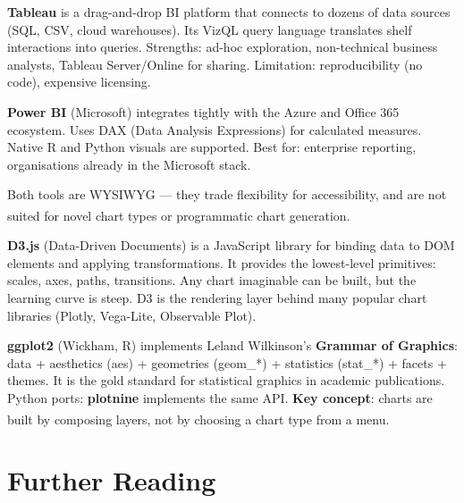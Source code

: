 \begin{tcbitemize}[ skin=sectionraster ]
    \tcbitem[title={Tableau and Power BI}, raster multicolumn=3]
    \textbf{Tableau} is a drag-and-drop BI platform that connects to dozens of data
    sources (SQL, CSV, cloud warehouses). Its VizQL query language translates shelf
    interactions into queries. Strengths: ad-hoc exploration, non-technical business
    analysts, Tableau Server/Online for sharing. Limitation: reproducibility (no code),
    expensive licensing.

    \textbf{Power BI} (Microsoft) integrates tightly with the Azure and Office 365
    ecosystem. Uses DAX (Data Analysis Expressions) for calculated measures. Native
    R and Python visuals are supported. Best for: enterprise reporting, organisations
    already in the Microsoft stack.

    Both tools are WYSIWYG --- they trade flexibility for accessibility, and are not
    suited for novel chart types or programmatic chart generation\textsuperscript{\cite[][pp.~1--30]{jansenHandbuchInfografik1999}}.

    \tcbitem[title={D3.js and ggplot2}, raster multicolumn=3]
    \textbf{D3.js} (Data-Driven Documents) is a JavaScript library for binding data to
    DOM elements and applying transformations. It provides the lowest-level primitives:
    scales, axes, paths, transitions. Any chart imaginable can be built, but the learning
    curve is steep. D3 is the rendering layer behind many popular chart libraries
    (Plotly, Vega-Lite, Observable Plot).

    \textbf{ggplot2} (Wickham, R) implements Leland Wilkinson's \textbf{Grammar of
    Graphics}: data + aesthetics (aes) + geometries (geom\_*) + statistics (stat\_*)
    + facets + themes. It is the gold standard for statistical graphics in academic
    publications. Python ports: \textbf{plotnine} implements the same API.
    \textbf{Key concept}: charts are built by composing layers, not by choosing a chart
    type from a menu\textsuperscript{\cite[][pp.~18--30]{loducaDataStorytellingAltair2024}}.
\end{tcbitemize}

\section{Further Reading}

